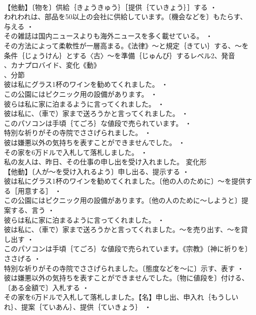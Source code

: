 \documentclass[8pt]{extreport}
\begin{document}
\begin{CJK}{UTF8}{min}
\\	【他動】〔物を〕供給｛きょうきゅう｝［提供｛ていきょう｝］する ・
\\	われわれは、部品を50以上の会社に供給しています。〔機会などを〕もたらす、与える ・
\\	その雑誌は国内ニュースよりも海外ニュースを多く載せている。 ・
\\	その方法によって柔軟性が一層高まる。《法律》～と規定｛きてい｝する、～を条件｛じょうけん｝とする〈古〉～を準備｛じゅんび｝するレベル2、発音
\\	、カナプロバイド、変化《動》
\\	、分節
\\	彼は私にグラス1杯のワインを勧めてくれました。 ・
\\	この公園にはピクニック用の設備があります。 ・
\\	彼らは私に家に泊まるように言ってくれました。 ・
\\	彼は私に、（車で）家まで送ろうかと言ってくれました。 ・
\\	このパソコンは手頃｛てごろ｝な値段で売られています。 ・
\\	特別な祈りがその寺院でささげられました。 ・
\\	彼は嫌悪以外の気持ちを表すことができませんでした。 ・
\\	その家を6万ドルで入札して落札しました。 ・
\\	私の友人は、昨日、その仕事の申し出を受け入れました。	変化形 
\\	【他動】〔人が～を受け入れるよう〕申し出る、提示する ・
\\	彼は私にグラス1杯のワインを勧めてくれました。〔他の人のために〕～を提供する［用意する］ ・
\\	この公園にはピクニック用の設備があります。〔他の人のために～しようと〕提案する、言う ・
\\	彼らは私に家に泊まるように言ってくれました。 ・
\\	彼は私に、（車で）家まで送ろうかと言ってくれました。～を売り出す、～を貸し出す ・
\\	このパソコンは手頃｛てごろ｝な値段で売られています。《宗教》〔神に祈りを〕ささげる ・
\\	特別な祈りがその寺院でささげられました。〔態度などを～に〕示す、表す ・
\\	彼は嫌悪以外の気持ちを表すことができませんでした。〔物に値段を〕付ける、〔ある金額で〕入札する ・
\\	その家を6万ドルで入札して落札しました。【名】申し出、申入れ｛もうしいれ｝、提案｛ていあん｝、提供｛ていきょう｝ ・

\end{CJK}
\end{document}
